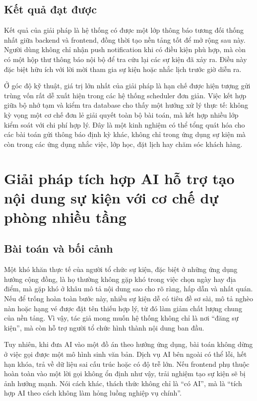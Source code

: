 \documentclass[../DoAn.tex]{subfiles}
\begin{document}
\subsection{Kết quả đạt được}
Kết quả của giải pháp là hệ thống có được một lớp thông báo tương đối thống nhất giữa backend và frontend, đồng thời tạo nền tảng tốt để mở rộng sau này. Người dùng không chỉ nhận push notification khi có điều kiện phù hợp, mà còn có một hộp thư thông báo nội bộ để tra cứu lại các sự kiện đã xảy ra. Điều này đặc biệt hữu ích với lời mời tham gia sự kiện hoặc nhắc lịch trước giờ diễn ra.

Ở góc độ kỹ thuật, giá trị lớn nhất của giải pháp là hạn chế được hiện tượng gửi trùng vốn rất dễ xuất hiện trong các hệ thống scheduler đơn giản. Việc kết hợp giữa bộ nhớ tạm và kiểm tra database cho thấy một hướng xử lý thực tế: không kỳ vọng một cơ chế đơn lẻ giải quyết toàn bộ bài toán, mà kết hợp nhiều lớp kiểm soát với chi phí hợp lý. Đây là một kinh nghiệm có thể tổng quát hóa cho các bài toán gửi thông báo định kỳ khác, không chỉ trong ứng dụng sự kiện mà còn trong các ứng dụng nhắc việc, lớp học, đặt lịch hay chăm sóc khách hàng.

\section{Giải pháp tích hợp AI hỗ trợ tạo nội dung sự kiện với cơ chế dự phòng nhiều tầng}
\label{sec:solution-ai-fallback}

\subsection{Bài toán và bối cảnh}
Một khó khăn thực tế của người tổ chức sự kiện, đặc biệt ở những ứng dụng hướng cộng đồng, là họ thường không gặp khó trong việc chọn ngày hay địa điểm, mà gặp khó ở khâu mô tả nội dung sao cho rõ ràng, hấp dẫn và nhất quán. Nếu để trống hoàn toàn bước này, nhiều sự kiện dễ có tiêu đề sơ sài, mô tả nghèo nàn hoặc hạng vé được đặt tên thiếu hợp lý, từ đó làm giảm chất lượng chung của nền tảng. Vì vậy, tác giả mong muốn hệ thống không chỉ là nơi “đăng sự kiện”, mà còn hỗ trợ người tổ chức hình thành nội dung ban đầu.

Tuy nhiên, khi đưa AI vào một đồ án theo hướng ứng dụng, bài toán không dừng ở việc gọi được một mô hình sinh văn bản. Dịch vụ AI bên ngoài có thể lỗi, hết hạn khóa, trả về dữ liệu sai cấu trúc hoặc có độ trễ lớn. Nếu frontend phụ thuộc hoàn toàn vào một lời gọi không ổn định như vậy, trải nghiệm tạo sự kiện sẽ bị ảnh hưởng mạnh. Nói cách khác, thách thức không chỉ là “có AI”, mà là “tích hợp AI theo cách không làm hỏng luồng nghiệp vụ chính”.
\end{document}
